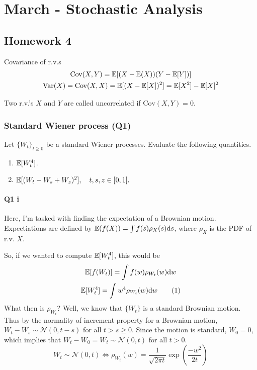 \chapter{March - Stochastic Analysis }

\section{Homework 4}

\begin{definition}{Covariance of r.v.s}{}
	\begin{gather*}
		\text{Cov}(X, Y) = \mathbb{E}[(X - \mathbb{E}(X))(Y - \mathbb{E}[Y])] \\
		\text{Var}(X) = \text{Cov}(X, X) = \mathbb{E}[(X - \mathbb{E}[X])^2] = \mathbb{E}[X^2] - \mathbb{E}[X]^2
	\end{gather*}
\end{definition}

\cloze Two r.v.'s $X$ and $Y$ are called uncorrelated if $\text{Cov}(X, Y) = 0$. 

\subsection{Standard Wiener process (Q1)}
Let $\{ W_t\}_{t\geq 0}$ be a standard Wiener processes. Evaluate the following quantities. 

\begin{enumerate}[label=(\roman*)] 
\item %
$\mathbb{E}[W_t^4]$.

\item %
$\mathbb{E}[(W_t - W_s + W_z)^2], \quad t, s, z \in [0, 1].$
\end{enumerate} %

\subsubsection*{Q1 i}
Here, I'm tasked with finding the expectation of a Brownian motion. Expectiations are defined by $\mathbb{E}(f(X)) = \int f(s) \rho_X(s) \text{d} s$, where $\rho_X$ is the PDF of r.v. $X$. 

So, if we wanted to compute $\mathbb{E}[W_t^4]$, this would be 
\begin{gather*}
	\mathbb{E}[f(W_t)] = \int f(w) \rho_{W_t}(w) \text{d} w	 \\
	\mathbb{E}[W_t^4] = \int w^4 \rho_{W_t}(w) \text{d} w \tag{1} 
\end{gather*}
What then is $\rho_{W_t}$? Well, we know that $\{W_t\}$ is a standard Brownian motion. Thus by the normality of increment property for a Brownian motion, $W_t - W_s \sim \mathcal{N}(0, t-s)$ for all $t >s \geq 0$. Since the motion is standard, $W_0 = 0$, which implies that $W_t - W_0  = W_t \sim \mathcal{N}(0, t)$ for all $t > 0$. 
\[ W_t \sim\mathcal{N}(0, t) \iff \rho_{W_t}(w) = \frac{1}{\sqrt{2\pi t}} \exp\left(\frac{-w^2}{2t} \right) \tag{2} \]


